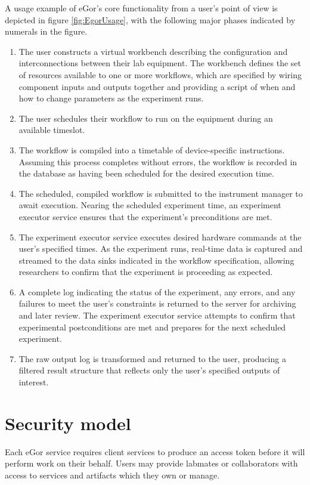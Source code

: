 \documentclass[../thesis]{subfiles}
\begin{document}
A usage example of eGor's core functionality from a user's point of
view is depicted in figure \ref{fig:EgorUsage}, with the following
major phases indicated by numerals in the figure.
\begin{enumerate}
  \item{
      The user constructs a virtual workbench describing the
      configuration and interconnections between their lab
      equipment. The workbench defines the set of resources available
      to one or more workflows, which are specified by wiring
      component inputs and outputs together and providing a script of
      when and how to change parameters as the experiment runs.
  }
  \item{
      The user schedules their workflow to run on the equipment during
      an available timeslot.
  }
  \item{
      The workflow is compiled into a timetable of device-specific
      instructions. Assuming this process completes without errors,
      the workflow is recorded in the database as having been
      scheduled for the desired execution time.
  }
  \item{
      The scheduled, compiled workflow is submitted to the instrument
      manager to await execution. Nearing the scheduled experiment
      time, an experiment executor service ensures that the experiment's
      preconditions are met.
  }
  \item{
      The experiment executor service executes desired hardware
      commands at the user's specified times. As the experiment runs,
      real-time data is captured and streamed to the data sinks
      indicated in the workflow specification, allowing researchers to
      confirm that the experiment is proceeding as expected.
  }
  \item{
      A complete log indicating the status of the experiment, any
      errors, and any failures to meet the user's constraints is
      returned to the server for archiving and later review. The
      experiment executor service attempts to confirm that experimental
      postconditions are met and prepares for the next scheduled
      experiment.
  }
  \item{
      The raw output log is transformed and returned to the user,
      producing a filtered result structure that reflects only the
      user's specified outputs of interest.
  }
\end{enumerate}



\section{Security model}
Each eGor service requires client services to produce an access token
before it will perform work on their behalf.
Users may provide labmates or collaborators with access to
services and artifacts which they own or manage.
\end{document}

